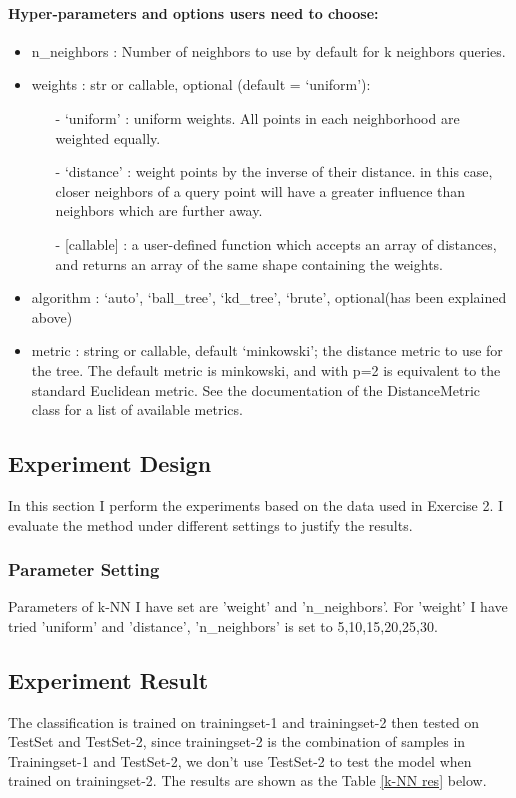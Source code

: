 \documentclass{article}
\begin{document}
	\paragraph{Hyper-parameters and options users need to choose:}
	\begin{itemize}
		\item n\_neighbors : Number of neighbors to use by default for k neighbors queries.
		\item weights : str or callable, optional (default = ‘uniform’):
		\begin{itemize}
			\item[-] ‘uniform’ : uniform weights. All points in each neighborhood are weighted equally.
			\item[-] ‘distance’ : weight points by the inverse of their distance. in this case, closer neighbors of a query point will have a greater influence than neighbors which are further away.
			\item[-] [callable] : a user-defined function which accepts an array of distances, and returns an array of the same shape containing the weights.
		\end{itemize}
	    \item algorithm : {‘auto’, ‘ball\_tree’, ‘kd\_tree’, ‘brute’}, optional(has been explained above)
	    \item metric : string or callable, default ‘minkowski’;
	    the distance metric to use for the tree. The default metric is minkowski, and with p=2 is equivalent to the standard Euclidean metric. See the documentation of the DistanceMetric class for a list of available metrics.
	\end{itemize}
	\subsection{Experiment Design}
	In this section I perform the experiments based on the data used in Exercise 2. I evaluate the method under different settings to justify the results.
	\subsubsection{Parameter Setting}
	Parameters of k-NN I have set are 'weight' and 'n\_neighbors'. For 'weight' I have tried 'uniform' and 'distance', 'n\_neighbors' is set to 5,10,15,20,25,30. 
	\subsection{Experiment Result}
	The classification is trained on trainingset-1 and trainingset-2 then tested on TestSet and TestSet-2, since trainingset-2 is the combination of samples in Trainingset-1 and TestSet-2, we don't use TestSet-2 to test the model when trained on trainingset-2. The results are shown as the Table \ref{k-NN res} below.
\end{document}
